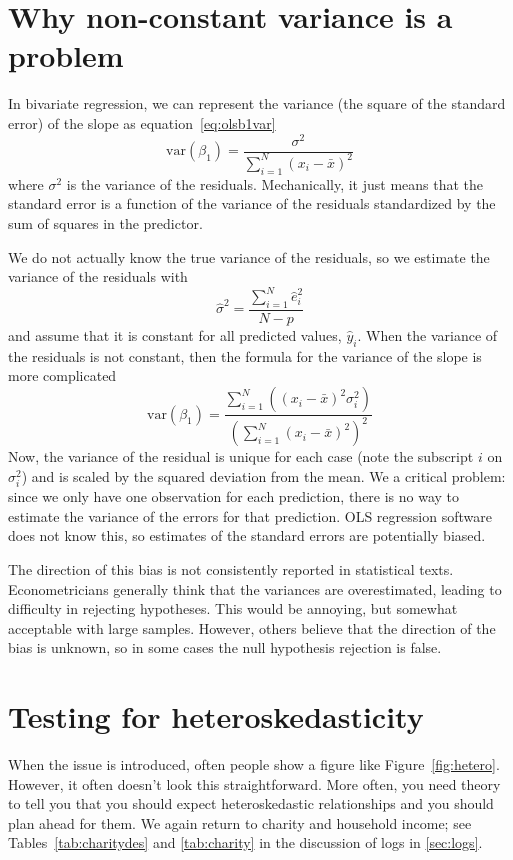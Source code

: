 \section{Why non-constant variance is a problem}

In bivariate regression, we can represent the variance (the square of the standard error) of the slope as equation~\eqref{eq:olsb1var}
\[
\mbox{var}\left(\beta_1\right)=\frac{\sigma^2}{\sum_{i=1}^N\left(x_i-\bar{x}\right)^2}
\]
where $\sigma^2$ is the variance of the residuals. Mechanically, it just means that the standard error is a function of the variance of the residuals standardized by the sum of squares in the predictor.

We do not actually know the true variance of the residuals, so we estimate the variance of the residuals with
\begin{equation}
\hat{\sigma}^2=\frac{\sum_{i=1}^N\hat{e}_i^2}{N-p}
\end{equation}
and assume that it is constant for all predicted values, $\hat{y}_i$. When the variance of the residuals is not constant, then the formula for the variance of the slope is more complicated
\begin{equation}
\mbox{var}\left(\beta_1\right)=\frac{\sum_{i=1}^N\left(\left(x_i-\bar{x}\right)^2\sigma_i^2\right)}{\left(\sum_{i=1}^N\left(x_i-\bar{x}\right)^2\right)^2}
\end{equation}
Now, the variance of the residual is unique for each case (note the subscript $i$ on $\sigma_i^2$) and is scaled by the squared deviation from the mean. We a critical problem: since we only have one observation for each prediction, there is no way to estimate the variance of the errors for that prediction. OLS regression software does not know this, so estimates of the standard errors are potentially biased.

The direction of this bias is not consistently reported in statistical texts. Econometricians generally think that the variances are overestimated, leading to difficulty in rejecting hypotheses. This would be annoying, but somewhat acceptable with large samples. However, others believe that the direction of the bias is unknown, so in some cases the null hypothesis rejection is false.

\section{Testing for heteroskedasticity}

When the issue is introduced, often people show a figure like Figure~\ref{fig:hetero}. However, it often doesn't look this straightforward. More often, you need theory to tell you that you should expect heteroskedastic relationships and you should plan ahead for them.  We again return to charity and household income; see Tables~\ref{tab:charitydes} and \ref{tab:charity} in the discussion of logs in \ref{sec:logs}.

